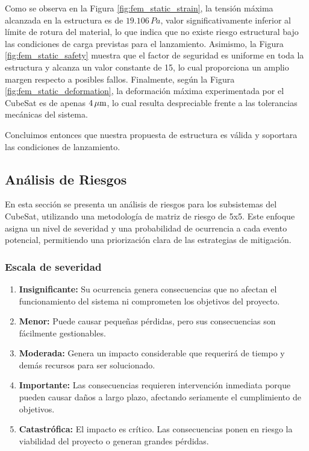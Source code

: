       Como se observa en la Figura \ref{fig:fem_static_strain}, la tensión máxima alcanzada en la estructura es de
      $19.106 \, Pa$, valor significativamente inferior al límite de rotura del material, lo que indica que no existe
      riesgo estructural bajo las condiciones de carga previstas para el lanzamiento. Asimismo, la Figura
      \ref{fig:fem_static_safety} muestra que el factor de seguridad es uniforme en toda la estructura y alcanza un
      valor constante de 15, lo cual proporciona un amplio margen respecto a posibles fallos. Finalmente, según la
      Figura \ref{fig:fem_static_deformation}, la deformación máxima experimentada por el CubeSat es de apenas $4\,\mathrm{\mu m}$,
      lo cual resulta despreciable frente a las tolerancias mecánicas del sistema.

      Concluimos entonces que nuestra propuesta de estructura es válida y soportara las condiciones de lanzamiento.

  \subsection{Análisis de Riesgos}
    En esta sección se presenta un análisis de riesgos para los subsistemas del CubeSat, utilizando una metodología de
    matriz de riesgo de 5x5. Este enfoque asigna un nivel de severidad y una probabilidad de ocurrencia a cada evento
    potencial, permitiendo una priorización clara de las estrategias de mitigación.
  
  \subsubsection{Escala de severidad}
  \begin{enumerate}[label=\textbf{\arabic*.}]
    \item \textbf{Insignificante:} Su ocurrencia genera consecuencias que no afectan el funcionamiento del sistema ni
      comprometen los objetivos del proyecto.
    \item \textbf{Menor:} Puede causar pequeñas pérdidas, pero sus consecuencias son fácilmente gestionables.
    \item \textbf{Moderada:} Genera un impacto considerable que requerirá de tiempo y demás recursos para ser
      solucionado.
    \item \textbf{Importante:} Las consecuencias requieren intervención inmediata porque pueden causar daños a largo
      plazo, afectando seriamente el cumplimiento de objetivos.
    \item \textbf{Catastrófica:} El impacto es crítico. Las consecuencias ponen en riesgo la viabilidad del proyecto o
      generan grandes pérdidas.
  \end{enumerate}
  
